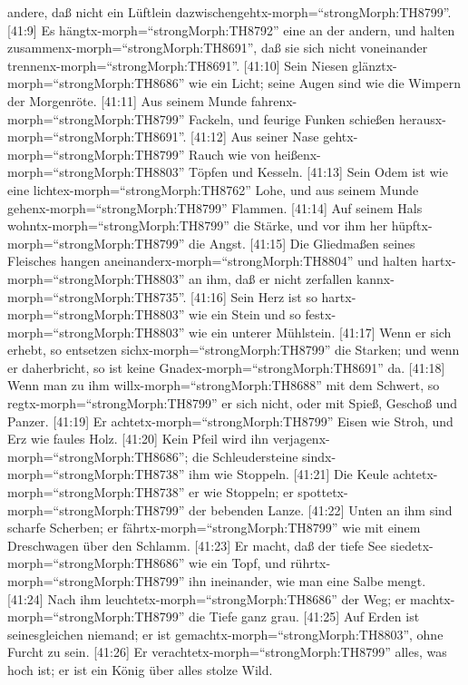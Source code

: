 andere, daß nicht ein Lüftlein
dazwischengehtx-morph=``strongMorph:TH8799''.  {[}41:9{]}
Es hängtx-morph=``strongMorph:TH8792'' eine an der andern, und halten
zusammenx-morph=``strongMorph:TH8691'', daß sie sich nicht voneinander
trennenx-morph=``strongMorph:TH8691''.  {[}41:10{]} Sein
Niesen glänztx-morph=``strongMorph:TH8686'' wie ein Licht; seine Augen
sind wie die Wimpern der Morgenröte.  {[}41:11{]} Aus
seinem Munde fahrenx-morph=``strongMorph:TH8799'' Fackeln, und feurige
Funken schießen herausx-morph=``strongMorph:TH8691''. 
{[}41:12{]} Aus seiner Nase gehtx-morph=``strongMorph:TH8799'' Rauch wie
von heißenx-morph=``strongMorph:TH8803'' Töpfen und Kesseln.
 {[}41:13{]} Sein Odem ist wie eine
lichtex-morph=``strongMorph:TH8762'' Lohe, und aus seinem Munde
gehenx-morph=``strongMorph:TH8799'' Flammen.  {[}41:14{]}
Auf seinem Hals wohntx-morph=``strongMorph:TH8799'' die Stärke, und vor
ihm her hüpftx-morph=``strongMorph:TH8799'' die Angst. 
{[}41:15{]} Die Gliedmaßen seines Fleisches hangen
aneinanderx-morph=``strongMorph:TH8804'' und halten
hartx-morph=``strongMorph:TH8803'' an ihm, daß er nicht zerfallen
kannx-morph=``strongMorph:TH8735''.  {[}41:16{]} Sein Herz
ist so hartx-morph=``strongMorph:TH8803'' wie ein Stein und so
festx-morph=``strongMorph:TH8803'' wie ein unterer Mühlstein.
 {[}41:17{]} Wenn er sich erhebt, so entsetzen
sichx-morph=``strongMorph:TH8799'' die Starken; und wenn er daherbricht,
so ist keine Gnadex-morph=``strongMorph:TH8691'' da. 
{[}41:18{]} Wenn man zu ihm willx-morph=``strongMorph:TH8688'' mit dem
Schwert, so regtx-morph=``strongMorph:TH8799'' er sich nicht, oder mit
Spieß, Geschoß und Panzer.  {[}41:19{]} Er
achtetx-morph=``strongMorph:TH8799'' Eisen wie Stroh, und Erz wie faules
Holz.  {[}41:20{]} Kein Pfeil wird ihn
verjagenx-morph=``strongMorph:TH8686''; die Schleudersteine
sindx-morph=``strongMorph:TH8738'' ihm wie Stoppeln. 
{[}41:21{]} Die Keule achtetx-morph=``strongMorph:TH8738'' er wie
Stoppeln; er spottetx-morph=``strongMorph:TH8799'' der bebenden Lanze.
 {[}41:22{]} Unten an ihm sind scharfe Scherben; er
fährtx-morph=``strongMorph:TH8799'' wie mit einem Dreschwagen über den
Schlamm.  {[}41:23{]} Er macht, daß der tiefe See
siedetx-morph=``strongMorph:TH8686'' wie ein Topf, und
rührtx-morph=``strongMorph:TH8799'' ihn ineinander, wie man eine Salbe
mengt.  {[}41:24{]} Nach ihm
leuchtetx-morph=``strongMorph:TH8686'' der Weg; er
machtx-morph=``strongMorph:TH8799'' die Tiefe ganz grau. 
{[}41:25{]} Auf Erden ist seinesgleichen niemand; er ist
gemachtx-morph=``strongMorph:TH8803'', ohne Furcht zu sein.
 {[}41:26{]} Er verachtetx-morph=``strongMorph:TH8799''
alles, was hoch ist; er ist ein König über alles stolze Wild.

